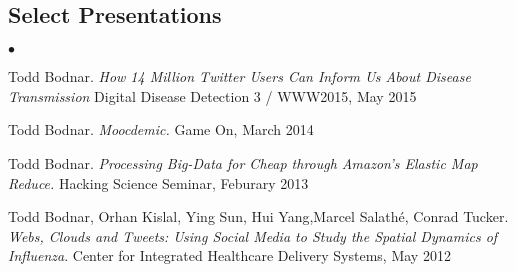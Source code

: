 \documentclass[margin,line]{res}
\newenvironment{list2}{
  \begin{list}{$\bullet$}{%
      \setlength{\itemsep}{0in}
      \setlength{\parsep}{0in} \setlength{\parskip}{0in}
      \setlength{\topsep}{0in} \setlength{\partopsep}{0in} 
      \setlength{\leftmargin}{10pt}}}{\end{list}}
\begin{document}
\begin{resume}

\section{\sc Select Presentations}
\begin{list2}
\item Todd Bodnar. \textit{How 14 Million Twitter Users Can Inform Us About Disease Transmission} Digital Disease Detection 3 / WWW2015, May 2015
\item Todd Bodnar. \textit{Moocdemic.} Game On, March 2014
\item Todd Bodnar. \textit{Processing Big-Data for Cheap through Amazon's Elastic Map Reduce.} Hacking Science Seminar, Feburary 2013
\item Todd Bodnar, Orhan Kislal, Ying Sun, Hui Yang,Marcel Salath\'e, Conrad 
Tucker. \textit{Webs, Clouds and Tweets: Using Social Media to Study the Spatial Dynamics of Influenza}. Center for Integrated Healthcare Delivery Systems, May 2012 
\end{list2}


\end{resume}
\end{document}
